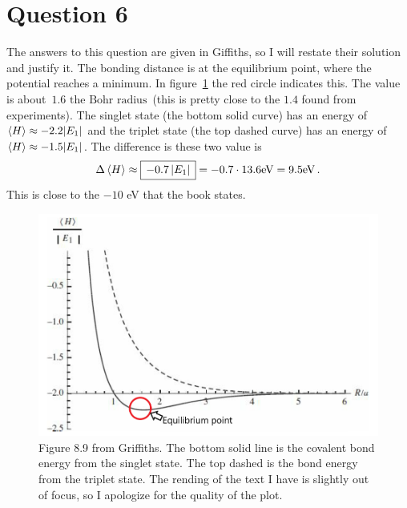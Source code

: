 \documentclass[11pt]{article}
\begin{document}
\newpage

\section*{Question 6}

The answers to this question are given in Giffiths, so I will restate their solution and justify it. The bonding distance is at the equilibrium point, where the potential reaches a minimum. In figure~\ref{fig:6.1} the red circle indicates this. The value is about $\boxed{\, 1.6 \text{ the Bohr radius}\,}$ (this is pretty close to the $1.4$ found from experiments). The singlet state (the bottom solid curve) has an energy of $\ev{H} \approx -2.2 \abs{E_1}$ and the triplet state (the top dashed curve) has an energy of $\ev{H} \approx -1.5\abs{E_1}$. The difference is these two value is 
\[\Delta \ev{H} \approx \boxed{\,-0.7 \, \abs{E_1}\,} = -0.7 \cdot 13.6 \text{eV} = 9.5 \text{eV} \, . \]
This is close to the $-10$ eV that the book states.

\begin{figure}[!ht]
\centering
	\includegraphics[width=0.9\linewidth]{phsx462_hw08_01.PNG}
	\caption{Figure 8.9 from Griffiths. The bottom solid line is the covalent bond energy from the singlet state. The top dashed is the bond energy from the triplet state. The rending of the text I have is slightly out of focus, so I apologize for the quality of the plot. }
	\label{fig:6.1}
\end{figure}
\end{document}
